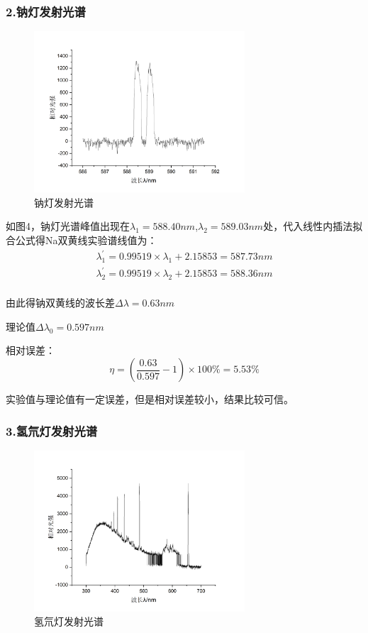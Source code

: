 \documentclass[12pt,a4paper,UTF8]{ctexart}
\begin{document}
\subsubsection*{2.钠灯发射光谱}
\begin{figure}[htbp]
	\centering
	\includegraphics[width=0.7\textwidth]{img//Na.png}
	\caption{钠灯发射光谱}
	\label{fig:4}
\end{figure}

如图4，钠灯光谱峰值出现在$\lambda_1=588.40nm$,$\lambda_2=589.03nm$处，代入线性内插法拟合公式得Na双黄线实验谱线值为：
\begin{gather*}
	\lambda^{'}_1=0.99519\times\lambda_1+2.15853=587.73nm\\
    \lambda^{'}_2=0.99519\times\lambda_2+2.15853=588.36nm\\
\end{gather*}

由此得钠双黄线的波长差$\varDelta\lambda=0.63nm$

理论值$\varDelta\lambda_0=0.597nm$

相对误差：
\begin{equation*}
	\eta=(\frac{0.63}{0.597}-1)\times100\%=5.53\%
\end{equation*}

实验值与理论值有一定误差，但是相对误差较小，结果比较可信。

\subsubsection*{3.氢氘灯发射光谱}
\begin{figure}[htbp]
	\centering
	\includegraphics[width=0.7\textwidth]{img//HH.png}
	\caption{氢氘灯发射光谱}
	\label{fig:5}
\end{figure}
\end{document}
